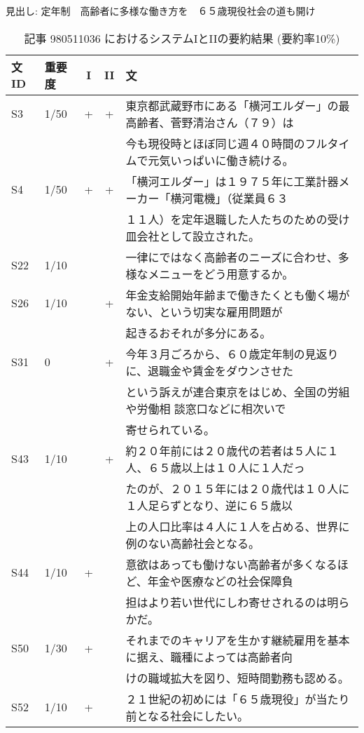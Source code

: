 \begin{table}[t]
\caption{記事 980511036 におけるシステムIとIIの要約結果 (要約率10\%)\label{ivsii}}
\begin{center}
見出し: 定年制　高齢者に多様な働き方を　６５歳現役社会の道も開け
{\scriptsize
\begin{tabular}{|l|l|c|c|l|}\hline
文ID   & 重要度 & I & II & 文 \\ \hline\hline
S3     & 1/50 & + & + & 東京都武蔵野市にある「横河エルダー」の最高齢者、菅野清治さん（７９）は\\
       &      &   &   & 今も現役時とほぼ同じ週４０時間のフルタイムで元気いっぱいに働き続ける。\\ \hline
S4     & 1/50 & + & + & 「横河エルダー」は１９７５年に工業計器メーカー「横河電機」（従業員６３\\
       &      &   &   & １１人）を定年退職した人たちのための受け皿会社として設立された。 \\ \hline
S22    & 1/10 &   &   & 一律にではなく高齢者のニーズに合わせ、多様なメニューをどう用意するか。 \\ \hline
S26    & 1/10 &   & + & 年金支給開始年齢まで働きたくとも働く場がない、という切実な雇用問題が\\
       &      &   &   & 起きるおそれが多分にある。 \\ \hline
S31    & 0    &   & + & 今年３月ごろから、６０歳定年制の見返りに、退職金や賃金をダウンさせた\\
       &      &   &   & という訴えが連合東京をはじめ、全国の労組や労働相 談窓口などに相次いで\\
       &      &   &   & 寄せられている。 \\ \hline
S43    & 1/10 &   & + & 約２０年前には２０歳代の若者は５人に１人、６５歳以上は１０人に１人だっ\\
       &      &   &   & たのが、２０１５年には２０歳代は１０人に１人足らずとなり、逆に６５歳以\\
       &      &   &   & 上の人口比率は４人に１人を占める、世界に例のない高齢社会となる。 \\ \hline
S44    & 1/10 & + &   & 意欲はあっても働けない高齢者が多くなるほど、年金や医療などの社会保障負\\
       &      &   &   & 担はより若い世代にしわ寄せされるのは明らかだ。 \\ \hline
S50    & 1/30 & + &   & それまでのキャリアを生かす継続雇用を基本に据え、職種によっては高齢者向\\
       &      &   &   & けの職域拡大を図り、短時間勤務も認める。 \\ \hline
S52    & 1/10 & + &   & ２１世紀の初めには「６５歳現役」が当たり前となる社会にしたい。 \\ \hline
\end{tabular}
}
\vspace{0.5cm}


\end{center}
\end{table}
